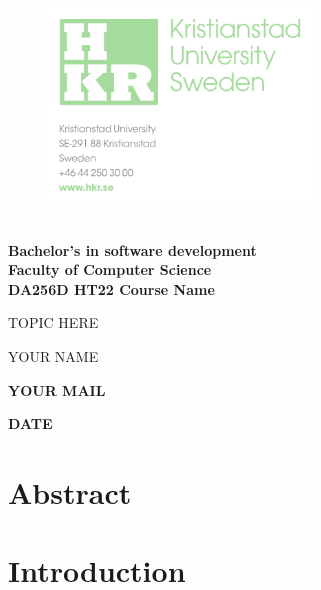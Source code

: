 \documentclass{article}
\begin{document}
	
	\begin{figure}[h!]

			\includegraphics[width=7cm]{images/hkr.png}
			\label{title}
	   \endminipage
		\endminipage
	\end{figure}
	
	\vspace{0.8cm}
	\Large

	\textbf{\\
	Bachelor’s in software development\\
	Faculty of Computer Science\\
	DA256D HT22 Course Name}
	\begin{center}
	\vspace{3cm}
	\Huge
	
	TOPIC HERE
	
	\vspace{2cm}
	\LARGE
	YOUR NAME
	
	\vspace{0.4cm}	
	\large
	\textbf{YOUR MAIL}		\vspace{0.9cm}	

    \textbf{DATE}
	\end{center}
	
\thispagestyle{empty}       %

\newpage
	





\tableofcontents
\large

\thispagestyle{empty}        %


\newpage 

\section*{Abstract}
\thispagestyle{empty}        %

\newpage
\section{Introduction}
\vspace{1cm}
\end{document}
